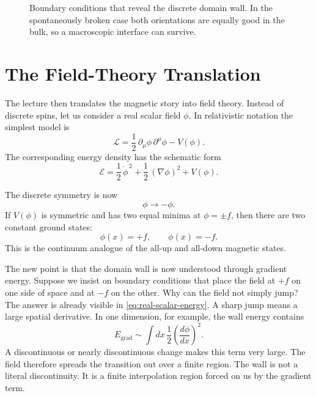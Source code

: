 \begin{figure}[t]
\centering
{}
\caption{Boundary conditions that reveal the discrete domain wall. In the spontaneously broken case both orientations are equally good in the bulk, so a macroscopic interface can survive.}
\label{fig:lecture07-domain-wall}
\end{figure}

\section{The Field-Theory Translation}

The lecture then translates the magnetic story into field theory. Instead of discrete spins, let us consider a real scalar field \(\phi\). In relativistic notation the simplest model is
\begin{equation}
\mathcal{L}=\frac12\,\partial_\mu\phi\,\partial^\mu\phi - V(\phi).
\label{eq:real-scalar-lagrangian}
\end{equation}
The corresponding energy density has the schematic form
\begin{equation}
\mathcal{E}=\frac12\,\dot{\phi}^{\,2}+\frac12\,(\nabla\phi)^2+V(\phi).
\label{eq:real-scalar-energy}
\end{equation}

The discrete symmetry is now
\[
\phi \longrightarrow -\phi.
\]
If \(V(\phi)\) is symmetric and has two equal minima at \(\phi=\pm f\), then there are two constant ground states:
\[
\phi(x)=+f,
\qquad
\phi(x)=-f.
\]
This is the continuum analogue of the all-up and all-down magnetic states.

The new point is that the domain wall is now understood through gradient energy. Suppose we insist on boundary conditions that place the field at \(+f\) on one side of space and at \(-f\) on the other. Why can the field not simply jump? The answer is already visible in \eqref{eq:real-scalar-energy}. A sharp jump means a large spatial derivative. In one dimension, for example, the wall energy contains
\begin{equation}
E_{\text{grad}} \sim \int dx\, \frac12\left(\frac{d\phi}{dx}\right)^2.
\label{eq:gradient-wall}
\end{equation}
A discontinuous or nearly discontinuous change makes this term very large. The field therefore spreads the transition out over a finite region. The wall is not a literal discontinuity. It is a finite interpolation region forced on us by the gradient term.

